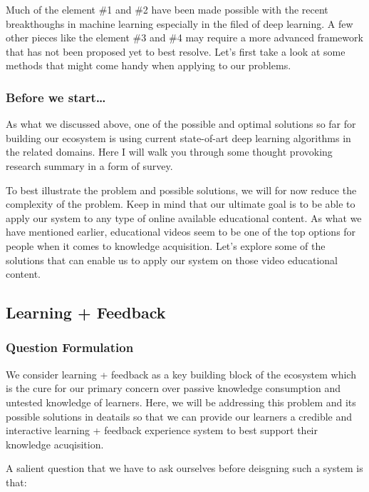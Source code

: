 \documentclass{acm_proc_article-sp}
\begin{document}
Much of the element \#1 and \#2 have been made possible with the recent
breakthoughs in machine learning especially in the filed of deep
learning. A few other pieces like the element \#3 and \#4 may require a
more advanced framework that has not been proposed yet to best resolve.
Let's first take a look at some methods that might come handy when
applying to our problems.

\subsubsection{Before we start\ldots{}}\label{before-we-start}

As what we discussed above, one of the possible and optimal solutions so
far for building our ecosystem is using current state-of-art deep
learning algorithms in the related domains. Here I will walk you through
some thought provoking research summary in a form of survey.

To best illustrate the problem and possible solutions, we will for now
reduce the complexity of the problem. Keep in mind that our ultimate
goal is to be able to apply our system to any type of online available
educational content. As what we have mentioned earlier, educational
videos seem to be one of the top options for people when it comes to
knowledge acquisition. Let's explore some of the solutions that can
enable us to apply our system on those video educational content.

\subsection{Learning + Feedback}\label{learning-feedback}

\subsubsection{Question Formulation}\label{question-formulation}

We consider learning + feedback as a key building block of the ecosystem
which is the cure for our primary concern over passive knowledge
consumption and untested knowledge of learners. Here, we will be
addressing this problem and its possible solutions in deatails so that
we can provide our learners a credible and interactive learning +
feedback experience system to best support their knowledge acuqisition.

A salient question that we have to ask ourselves before deisgning such a
system is that:
\end{document}
